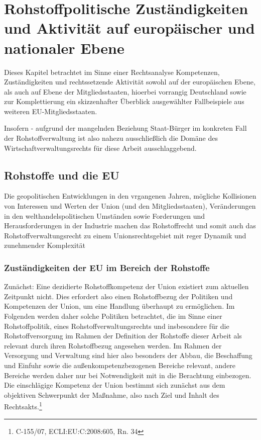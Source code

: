 \documentclass[12pt,a4paper,oneside]{book} %
\begin{document}
	
\chapter{Rohstoffpolitische Zuständigkeiten und Aktivität auf europäischer und nationaler Ebene}

Dieses Kapitel betrachtet im Sinne einer Rechtsanalyse Kompetenzen, Zuständigkeiten und rechtssetzende Aktivität sowohl auf der europäischen Ebene, als auch auf Ebene der Mitgliedsstaaten, hioerbei vorrangig Deutschland sowie zur Komplettierung ein skizzenhafter Überblick ausgewählter Fallbeispiele aus weiteren EU-Mitgliedsstaaten.	
	
	
	Insofern - aufgrund der mangelnden Beziehung Staat-Bürger im konkreten Fall der Rohstoffverwaltung ist also nahezu ausschließlich die Domäne des Wirtschaftverwaltungsrechts für diese Arbeit ausschlaggebend.
	
	\section{Rohstoffe und die EU}
	
	Die geopolitischen Entwicklungen in den vrgangenen Jahren, mögliche Kollisionen von Interessen und Werten der Union (und den Mitgliedsstaaten), Veränderungen in den welthandelspolitischen Umständen sowie Forderungen und Herausforderungen in der Industrie machen das Rohstoffrecht und somit auch das Rohstoffverwaltungsrecht zu einem Unionsrechtsgebiet mit reger Dynamik und zunehmender Komplexität
	
	\subsection{Zuständigkeiten der EU im Bereich der Rohstoffe}
	
	Zunächst: Eine dezidierte Rohstoffkompetenz der Union existiert zum aktuellen Zeitpunkt nicht. Dies erfordert also einen Rohstoffbezug der Politiken und Kompetenzen der Union, um eine Handlung überhaupt zu ermöglichen. Im Folgenden werden daher solche Politiken betrachtet, die im Sinne einer Rohstoffpolitik, eines Rohstoffverwaltungsrechts und insbesondere für die Rohstoffversorgung im Rahmen der Definition der Rohstoffe dieser Arbeit als relevant durch ihren Rohstoffbezug angesehen werden. Im Rahmen der Versorgung und Verwaltung sind hier also besonders der Abbau, die Beschaffung und Einfuhr sowie die außenkompetenzbezogenen Bereiche relevant, andere Bereiche werden daher nur bei Notwendigkeit mit in die Berachtung einbezogen. Die einschlägige Kompetenz der Union bestimmt sich zunächst aus dem objektiven Schwerpunkt der Maßnahme, also nach Ziel und Inhalt des Rechtsakts.\footnote{C-155/07, ECLI:EU:C:2008:605, Rn. 34}
	
\end{document}
